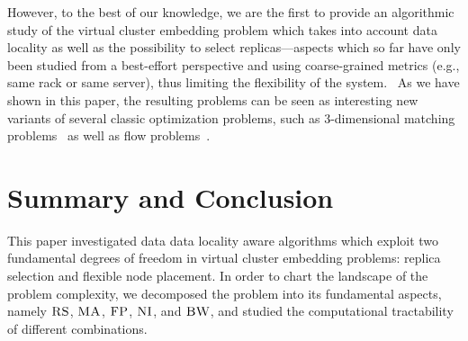 \documentclass[9pt]{sigcomm-alternate}
\newcommand{\CC}{\textsc{NI}}
\newcommand{\FP}{\textsc{FP}}
\newcommand{\RS}{\textsc{RS}}
\newcommand{\BW}{\textsc{BW}}
\newcommand{\MA}{\textsc{MA}}
\begin{document}
However, to the best of our knowledge, we are the first to provide an algorithmic
study of the virtual cluster embedding problem which takes into account
data locality as well as the possibility to select replicas---aspects which so far have only
been studied from a best-effort perspective and using coarse-grained metrics (e.g., same rack or same server), thus limiting the flexibility of the
system.~\cite{local-schedule-1,local-schedule-2,local-schedule-3} As we have shown in this paper,
the resulting problems can be seen as interesting new variants of several classic optimization
problems, such as 3-dimensional matching problems~\cite{3SC-hard} as well as flow problems~\cite{korte2002combinatorial}.


\section{Summary and Conclusion}\label{sec:conclusion}

This paper investigated data data locality aware algorithms which exploit two fundamental
degrees of freedom in virtual cluster
embedding problems: replica selection and flexible node placement. In order to
chart the landscape of the problem complexity, we
decomposed the problem into its fundamental aspects,
namely $\RS$, $\MA$, $\FP$, $\CC$, and $\BW$, and studied the computational
tractability of different combinations.
\end{document}
